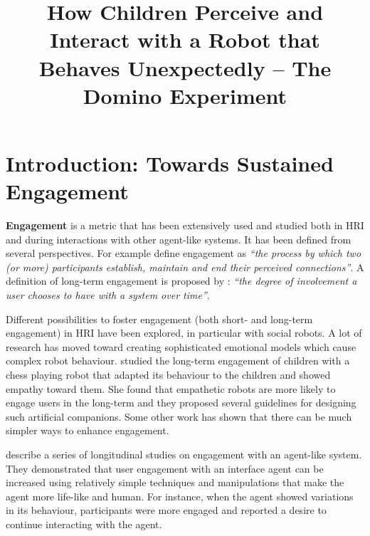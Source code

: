 \documentclass{sig-alternate}
\title{\LARGE \bf
How Children Perceive and Interact with a Robot that Behaves Unexpectedly -- The Domino Experiment
}
\begin{document}
\maketitle
\begin{abstract}

\end{abstract}
\section{Introduction: Towards Sustained Engagement}

\textbf{Engagement} is a metric that has been extensively used and studied both
in HRI and during interactions with other agent-like systems. It has been
defined from several perspectives. For example \cite{sidner_where_2004} define
engagement as \textit{``the process by which two (or more) participants
establish, maintain and end their perceived connections''}. A definition of
long-term engagement is proposed by \cite{bickmore_maintaining_2010}:
\textit{``the degree of involvement a user chooses to have with a system over
time''}.

Different possibilities to foster engagement (both short- and long-term
engagement) in HRI have been explored, in particular with social robots. A lot
of research has moved toward creating sophisticated emotional models which cause
complex robot behaviour. \cite{leite_long-term_2013} studied the long-term
engagement of children with a chess playing robot that adapted its behaviour to
the children and showed empathy toward them. She found that empathetic robots
are more likely to engage users in the long-term and they proposed several
guidelines for designing such artificial companions. Some other work
\cite{bickmore_maintaining_2010,short_no_2010} has shown that there can be much
simpler ways to enhance engagement. 

\cite{bickmore_maintaining_2010} describe a series of longitudinal studies on
engagement with an agent-like system. They demonstrated that user engagement
with an interface agent can be increased using relatively simple techniques and
manipulations that make the agent more life-like and human. For instance, when
the agent showed variations in its behaviour, participants were more engaged and
reported a desire to continue interacting with the agent.
\end{document}
